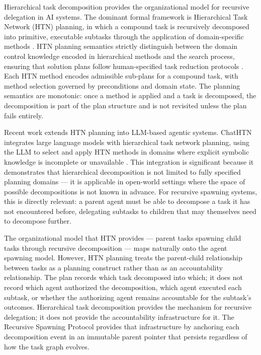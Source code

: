 Hierarchical task decomposition provides the organizational model for recursive delegation in AI systems. The dominant formal framework is Hierarchical Task Network (HTN) planning, in which a compound task is recursively decomposed into primitive, executable subtasks through the application of domain-specific methods \cite{xu2025htn,emergetmindhtn2025}. HTN planning semantics strictly distinguish between the domain control knowledge encoded in hierarchical methods and the search process, ensuring that solution plans follow human-specified task reduction protocols \cite{xu2025htn}. Each HTN method encodes admissible sub-plans for a compound task, with method selection governed by preconditions and domain state. The planning semantics are monotonic: once a method is applied and a task is decomposed, the decomposition is part of the plan structure and is not revisited unless the plan fails entirely.

Recent work extends HTN planning into LLM-based agentic systems. ChatHTN integrates large language models with hierarchical task network planning, using the LLM to select and apply HTN methods in domains where explicit symbolic knowledge is incomplete or unavailable \cite{arxiv2505.11814}. This integration is significant because it demonstrates that hierarchical decomposition is not limited to fully specified planning domains — it is applicable in open-world settings where the space of possible decompositions is not known in advance. For recursive spawning systems, this is directly relevant: a parent agent must be able to decompose a task it has not encountered before, delegating subtasks to children that may themselves need to decompose further.

The organizational model that HTN provides — parent tasks spawning child tasks through recursive decomposition — maps naturally onto the agent spawning model. However, HTN planning treats the parent-child relationship between tasks as a planning construct rather than as an accountability relationship. The plan records which task decomposed into which; it does not record which agent authorized the decomposition, which agent executed each subtask, or whether the authorizing agent remains accountable for the subtask's outcomes. Hierarchical task decomposition provides the mechanism for recursive delegation; it does not provide the accountability infrastructure for it. The Recursive Spawning Protocol provides that infrastructure by anchoring each decomposition event in an immutable parent pointer that persists regardless of how the task graph evolves.

